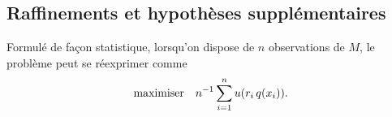 \subsection{Raffinements et hypothèses supplémentaires}


Formulé de façon statistique, lorsqu'on dispose de $n$ observations de $M$, le problème
peut se réexprimer comme
\begin{equation}
  \begin{array}{ll}\operatorname*{maximiser} & \displaystyle{n^{-1}\sum_{i=1}^nu(r_i\,q(x_i)).}\end{array}
\end{equation}



